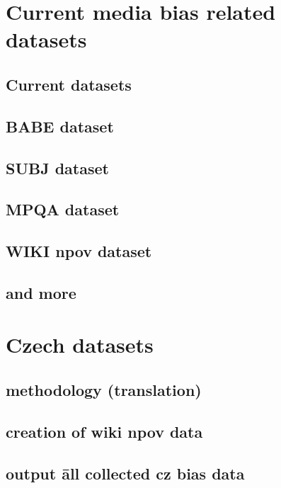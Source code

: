 \chapter{Current media bias related datasets}

\section{Current datasets}
\section{BABE dataset}
\section{SUBJ dataset}
\section{MPQA dataset}
\section{WIKI npov dataset}
\section{and more}

\chapter{Czech datasets}
\section{methodology (translation)}
\section{creation of wiki npov data}
\section{output \= all collected cz bias data}